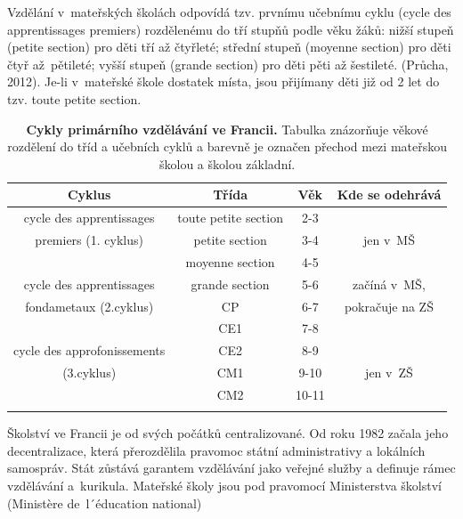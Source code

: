 		Vzdělání v mateřských školách odpovídá tzv. prvnímu učebnímu cyklu (cycle des apprentissages premiers) rozdělenému do tří stupňů podle věku žáků: nižší stupeň (petite section) pro děti tří až čtyřleté; střední stupeň (moyenne section) pro děti čtyř až pětileté; vyšší stupeň (grande section) pro děti pěti až šestileté.
		(Průcha, 2012). 
		Je-li v~mateřské škole dostatek místa, jsou přijímany děti již od 2 let do tzv. toute petite section. 

\begin{spacing}{1.0}
\begin{table}[h]
	\center
	\small
	\begin{center}
	\begin{tabular}{|c|ccc|}
		\hline
		\rowcolor{grey}
		\textbf{Cyklus}				& \textbf{Třída}		& \textbf{Věk}	& \textbf{Kde se odehrává}	\\
		\hline
		\hline
		\rowcolor{grey!10}
	\cellcolor{white} cycle des apprentissages	& toute petite section 	& 2-3 		&				\\ \rowcolor{grey!20}
	\cellcolor{white} premiers (1. cyklus)		& petite section 		& 3-4 		& jen v~MŠ 		\\ \rowcolor{grey!20}
	\cellcolor{white}							& moyenne section 		& 4-5 		& 				\\ \rowcolor{grey!20}
		\hline
	\cellcolor{white} cycle des apprentissages 	& grande section 		& 5-6 		& začíná v~MŠ, 		\\ \rowcolor{grey!50}
	\cellcolor{white} fondametaux (2.cyklus) 		& CP 					& 6-7 		& pokračuje na ZŠ 	\\ \rowcolor{grey!50}
	\cellcolor{white}								& CE1 					& 7-8 		& 					\\ \rowcolor{grey!50}
		\hline
	\cellcolor{white} cycle des approfonissements & CE2 					& 8-9 		&					\\ \rowcolor{grey!50}
	\cellcolor{white} (3.cyklus)					& CM1 					& 9-10 		& jen v~ZŠ 			\\ \rowcolor{grey!50}
	\cellcolor{white}								& CM2 					& 10-11 	& 					\\ \rowcolor{grey!50}
		\hline
	\end{tabular}
	\end{center}
	\caption{ \textbf{Cykly primárního vzdělávání ve Francii.} Tabulka znázorňuje věkové rozdělení do tříd a učebních cyklů a barevně je označen přechod mezi mateřskou školou a školou základní. 
	}
	\label{tab:rozdeleniTridFR}
\end{table}
\end{spacing}
		Školství ve Francii je od svých počátků centralizované. Od roku 1982 začala jeho decentralizace, která přerozdělila pravomoc státní administrativy a lokálních samospráv. Stát zůstává garantem vzdělávání jako veřejné služby a definuje rámec vzdělávání a kurikula. Mateřské školy jsou pod pravomocí Ministerstva školství (Ministère de l´éducation national)



